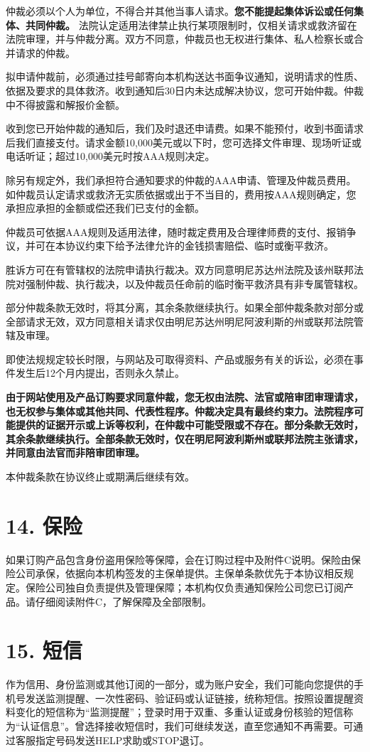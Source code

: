 \documentclass[UTF8,fontset=none,11pt,a4paper]{ctexart}
\begin{document}
仲裁必须以个人为单位，不得合并其他当事人请求。\textbf{您不能提起集体诉讼或任何集体、共同仲裁。} 法院认定适用法律禁止执行某项限制时，仅相关请求或救济留在法院审理，并与仲裁分离。双方不同意，仲裁员也无权进行集体、私人检察长或合并请求的仲裁。


拟申请仲裁前，必须通过挂号邮寄向本机构送达书面争议通知，说明请求的性质、依据及要求的具体救济。收到通知后30日内未达成解决协议，您可开始仲裁。仲裁中不得披露和解报价金额。


收到您已开始仲裁的通知后，我们及时退还申请费。如果不能预付，收到书面请求后我们直接支付。请求金额10,000美元或以下时，您可选择文件审理、现场听证或电话听证；超过10,000美元时按AAA规则决定。


除另有规定外，我们承担符合通知要求的仲裁的AAA申请、管理及仲裁员费用。如仲裁员认定请求或救济无实质依据或出于不当目的，费用按AAA规则确定，您承担应承担的金额或偿还我们已支付的金额。


仲裁员可依据AAA规则及适用法律，随时裁定费用及合理律师费的支付、报销争议，并可在本协议约束下给予法律允许的金钱损害赔偿、临时或衡平救济。


胜诉方可在有管辖权的法院申请执行裁决。双方同意明尼苏达州法院及该州联邦法院对强制仲裁、执行裁决，以及仲裁员任命前的临时衡平救济具有非专属管辖权。


部分仲裁条款无效时，将其分离，其余条款继续执行。如果全部仲裁条款对部分或全部请求无效，双方同意相关请求仅由明尼苏达州明尼阿波利斯的州或联邦法院管辖及审理。


即使法规规定较长时限，与网站及可取得资料、产品或服务有关的诉讼，必须在事件发生后12个月内提出，否则永久禁止。


\textbf{由于网站使用及产品订购要求同意仲裁，您无权由法院、法官或陪审团审理请求，也无权参与集体或其他共同、代表性程序。仲裁决定具有最终约束力。法院程序可能提供的证据开示或上诉等权利，在仲裁中可能受限或不存在。部分条款无效时，其余条款继续执行。全部条款无效时，仅在明尼阿波利斯州或联邦法院主张请求，并同意由法官而非陪审团审理。}


本仲裁条款在协议终止或期满后继续有效。


\section*{14. 保险}
如果订购产品包含身份盗用保险等保障，会在订购过程中及附件C说明。保险由保险公司承保，依据向本机构签发的主保单提供。主保单条款优先于本协议相反规定。保险公司独自负责提供及管理保障；本机构仅负责通知保险公司您已订阅产品。请仔细阅读附件C，了解保障及全部限制。


\section*{15. 短信}
作为信用、身份监测或其他订阅的一部分，或为账户安全，我们可能向您提供的手机号发送监测提醒、一次性密码、验证码或认证链接，统称短信。按照设置提醒资料变化的短信称为“监测提醒”；登录时用于双重、多重认证或身份核验的短信称为“认证信息”。曾选择接收短信时，我们可继续发送，直至您通知不再需要。可通过客服指定号码发送HELP求助或STOP退订。
\end{document}
